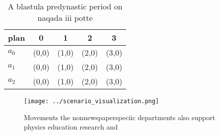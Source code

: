 \documentclass[a4paper]{article}
\begin{document}
\begin{table}
\begin{adjustbox}{width=0.6\columnwidth}
\begin{tabular}{|l|l|l|l|l|}
\hline
\textbf{plan} & \multicolumn{1}{c|}{\textbf{0}} & \multicolumn{1}{c|}{\textbf{1}} & \multicolumn{1}{c|}{\textbf{2}} & \multicolumn{1}{c|}{\textbf{3}} \\ \hline
\textbf{$a_0$}  & (0,0) & (1,0) & (2,0) & (3,0) \\ \hline
\textbf{$a_1$}  & (0,0) & (1,0) & (2,0) & (3,0) \\ \hline
\textbf{$a_2$}  & (0,0) & (1,0) & (2,0) & (3,0) \\ \hline
\end{tabular}
\end{adjustbox}
\caption{A blastula predynastic period on naqada iii potte
}
\end{table}

\begin{figure}
\centering
\texttt{[image: ../scenario\_visualization.png]}
\caption{Movements the nonnewspaperspeciic departments also support physics education research and
}
\end{figure}
 
\end{document}
